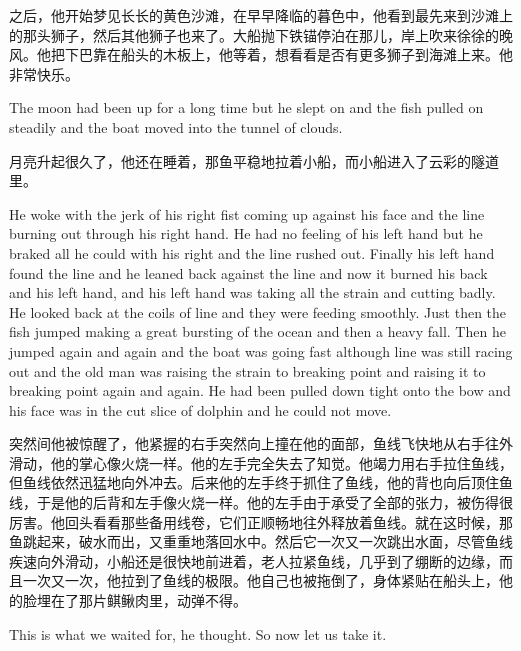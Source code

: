 \begin{paracol}{2}
\switchcolumn

之后，他开始梦见长长的黄色沙滩，在早早降临的暮色中，他看到最先来到沙滩上的那头狮子，然后其他狮子也来了。大船抛下铁锚停泊在那儿，岸上吹来徐徐的晚风。他把下巴靠在船头的木板上，他等着，想看看是否有更多狮子到海滩上来。他非常快乐。

\switchcolumn*

The moon had been up for a long time but he slept on and the fish pulled on
steadily and the boat moved into the \gls{tunnel} of clouds.

\switchcolumn

月亮升起很久了，他还在睡着，那鱼平稳地拉着小船，而小船进入了云彩的隧道里。

\switchcolumn*

He woke with the jerk of his right \gls{fist} coming up against his face and
the line burning out through his right hand. He had no feeling of his left
hand but he \gls{braked} all he could with his right and the line rushed
out. Finally his left hand found the line and he leaned back against the
line and now it burned his back and his left hand, and his left hand was
taking all the strain and cutting badly. He looked back at the coils of line
and they were feeding smoothly. Just then the fish jumped making a great
\gls{bursting} of the ocean and then a heavy fall. Then he jumped again and
again and the boat was going fast although line was still racing out and the
old man was raising the strain to breaking point and raising it to breaking
point again and again. He had been pulled down tight onto the bow and his
face was in the cut slice of dolphin and he could not move.

\switchcolumn

突然间他被惊醒了，他紧握的右手突然向上撞在他的面部，鱼线飞快地从右手往外滑动，他的掌心像火烧一样。他的左手完全失去了知觉。他竭力用右手拉住鱼线，但鱼线依然迅猛地向外冲去。后来他的左手终于抓住了鱼线，他的背也向后顶住鱼线，于是他的后背和左手像火烧一样。他的左手由于承受了全部的张力，被伤得很厉害。他回头看看那些备用线卷，它们正顺畅地往外释放着鱼线。就在这时候，那鱼跳起来，破水而出，又重重地落回水中。然后它一次又一次跳出水面，尽管鱼线疾速向外滑动，小船还是很快地前进着，老人拉紧鱼线，几乎到了绷断的边缘，而且一次又一次，他拉到了鱼线的极限。他自己也被拖倒了，身体紧贴在船头上，他的脸埋在了那片鲯鳅肉里，动弹不得。

\switchcolumn*

This is what we waited for, he thought. So now let us take it.

\switchcolumn


\end{paracol}
